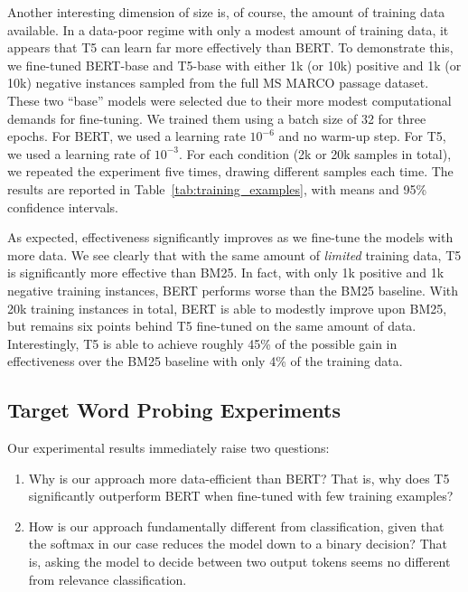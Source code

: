 \documentclass{article}
\begin{document}
Another interesting dimension of size is, of course, the amount of training data available.
In a data-poor regime with only a modest amount of training data, it appears that T5 can learn far more effectively than BERT.
To demonstrate this, we fine-tuned BERT-base and T5-base with either 1k (or 10k) positive and 1k (or 10k) negative instances sampled from the full MS MARCO passage dataset.
These two ``base'' models were selected due to their more modest computational demands for fine-tuning.
We trained them using a batch size of 32 for three epochs. For BERT, we used a learning rate $10^{-6}$ and no warm-up step. For T5, we used a learning rate of $10^{-3}$.
For each condition (2k or 20k samples in total), we repeated the experiment five times, drawing different samples each time.
The results are reported in Table~\ref{tab:training_examples}, with means and 95\% confidence intervals.

As expected, effectiveness significantly improves as we fine-tune the models with more data.
We see clearly that with the same amount of {\it limited} training data, T5 is significantly more effective than BM25.
In fact, with only 1k positive and 1k negative training instances, BERT performs worse than the BM25 baseline.
With 20k training instances in total, BERT is able to modestly improve upon BM25, but remains six points behind T5 fine-tuned on the same amount of data.
Interestingly, T5 is able to achieve roughly 45\% of the possible gain in effectiveness over the BM25 baseline with only 4\% of the training data.

\subsection{Target Word Probing Experiments}

Our experimental results immediately raise two questions:

\begin{enumerate}[leftmargin=*]

\item Why is our approach more data-efficient than BERT?
That is, why does T5 significantly outperform BERT when fine-tuned with few training examples?

\item How is our approach fundamentally different from classification, given that the softmax in our case reduces the model down to a binary decision?
That is, asking the model to decide between two output tokens seems no different from relevance classification.

\end{enumerate}
\end{document}
